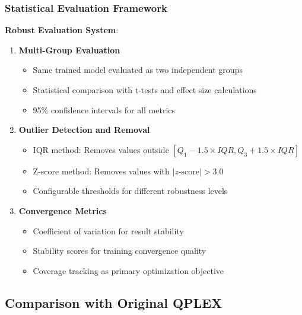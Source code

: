 \documentclass[12pt,a4paper]{report}
\begin{document}
\subsubsection{Statistical Evaluation Framework}
\textbf{Robust Evaluation System}:
\begin{enumerate}
\item \textbf{Multi-Group Evaluation}
\begin{itemize}
\item Same trained model evaluated as two independent groups
\item Statistical comparison with t-tests and effect size calculations
\item 95\% confidence intervals for all metrics
\end{itemize}

\item \textbf{Outlier Detection and Removal}
\begin{itemize}
\item IQR method: Removes values outside $[Q_1 - 1.5 \times IQR, Q_3 + 1.5 \times IQR]$
\item Z-score method: Removes values with $|z\text{-score}| > 3.0$
\item Configurable thresholds for different robustness levels
\end{itemize}

\item \textbf{Convergence Metrics}
\begin{itemize}
\item Coefficient of variation for result stability
\item Stability scores for training convergence quality
\item Coverage tracking as primary optimization objective
\end{itemize}
\end{enumerate}

\subsection{Comparison with Original QPLEX}
\end{document}
